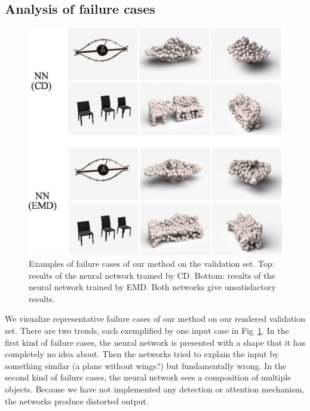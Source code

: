 \subsection{Analysis of failure cases}

\begin{figure}
\centering
\includegraphics[width=\linewidth]{./fig/show_failure}
\caption{Examples of failure cases of our method on the validation set. Top: results of the neural network trained by CD. Bottom: results of the neural network trained by EMD. Both networks give unsatisfactory results.}
\label{fig:failure_case}
\end{figure}

We visualize representative failure cases of our method on our rendered validation set. There are two trends, each exemplified by one input case in Fig~\ref{fig:failure_case}. In the first kind of failure cases, the neural network is presented with a shape that it has completely no idea about. Then the networks tried to explain the input by something similar (a plane without wings?) but fundamentally wrong. In the second kind of failure cases, the neural network sees a composition of multiple objects. Because we have not implemented any detection or attention mechanism, the networks produce distorted output.


